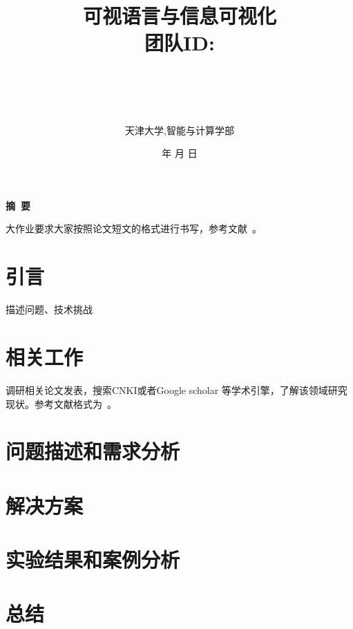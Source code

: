 \documentclass[a4paper]{article}
\begin{document}
\renewcommand{\contentsname}{目\ 录}
\renewcommand{\appendixname}{附录}
\renewcommand{\appendixpagename}{附录}
\renewcommand{\refname}{参考文献}

\renewcommand{\tablename}{表}
\renewcommand{\today}{\number\year 年 \number\month 月 \number\day 日}

\title{{\Huge 可视语言与信息可视化{\large\linebreak\\}}{\Large 团队ID: \linebreak}
{\Large  \linebreak\linebreak}}
\author{ \\
\\\\\\
天津大学,智能与计算学部}
\date{\today}
\maketitle
\newpage

\begin{center}
\tableofcontents\label{c}
\end{center}
\newpage


\begin{center}
{\Large\bf{摘\ 要\\}}

大作业要求大家按照论文短文的格式进行书写，参考文献~\cite{bayrak2020pragma, govyadinov2019graph}。



\end{center}

\newpage



\section{引言}
\label{overview}

描述问题、技术挑战

\section{相关工作}

调研相关论文发表，搜索CNKI或者Google scholar 等学术引擎，了解该领域研究现状。参考文献格式为~\cite{bayrak2020pragma}。

\section{问题描述和需求分析}
\label{Data and Task Abstraction}


\section{解决方案}


\section{实验结果和案例分析}\label{sub:ptxeva}


\section{总结}



\end{document}
